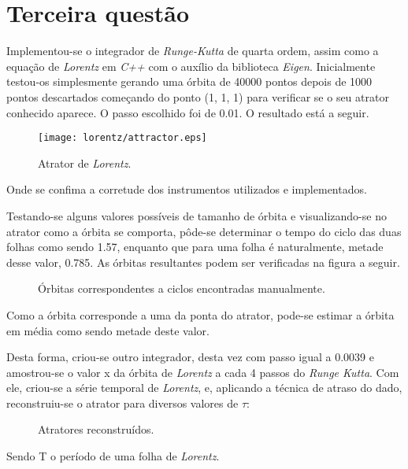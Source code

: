 \documentclass{article}[twocolumn]
\begin{document}
	\section{Terceira quest\~ao}
	Implementou-se o integrador de \textit{Runge-Kutta} de quarta ordem, assim como a
	equa\c{c}\~ao de \textit{Lorentz} em \textit{C++} com o aux\'ilio da biblioteca
	\textit{Eigen}. Inicialmente testou-os simplesmente gerando uma \'orbita de 40000 pontos
	depois de 1000 pontos descartados come\c{c}ando do ponto (1, 1, 1) para verificar se
	o seu atrator conhecido aparece. O passo escolhido foi de 0.01. O resultado est\'a a seguir.
	\begin{figure}[H]
		\centering
		\texttt{[image: lorentz/attractor.eps]}
		\caption{Atrator de \textit{Lorentz}.}
	\end{figure}
	Onde se confima a corretude dos instrumentos utilizados e implementados.

	Testando-se alguns valores poss\'iveis de tamanho de \'orbita e visualizando-se
	no atrator como a \'orbita se comporta, p\^ode-se determinar o tempo do ciclo das duas
	folhas como sendo 1.57, enquanto que para uma folha \'e naturalmente, metade desse valor,
	0.785. As \'orbitas resultantes podem ser verificadas na figura a seguir.
	\begin{figure}[H]
		\centering
		\caption{\'Orbitas correspondentes a ciclos encontradas manualmente.}
	\end{figure}
	Como a \'orbita corresponde a uma da ponta do atrator, pode-se estimar a \'orbita em m\'edia
	como sendo metade deste valor.

	Desta forma, criou-se outro integrador, desta vez com passo igual a 0.0039 e amostrou-se
	o valor x da \'orbita de \textit{Lorentz} a cada 4 passos do \textit{Runge Kutta}. Com ele,
	criou-se a s\'erie temporal de \textit{Lorentz}, e, aplicando a t\'ecnica de atraso do dado,
	reconstruiu-se o atrator para diversos valores de $\tau$:
	\begin{figure}[H]
		\centering
		\caption{Atratores reconstru\'idos.}
	\end{figure}
	Sendo T o per\'iodo de uma folha de \textit{Lorentz}.
\end{document}
